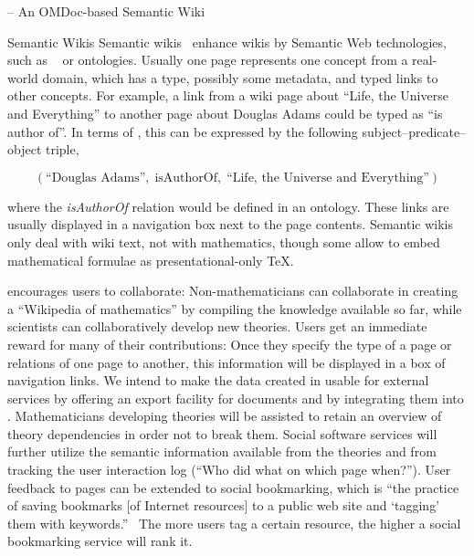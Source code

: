 \begin{omgroup}[id=swim,creators={clange,miko}]{{\swim} -- An OMDoc-based Semantic Wiki}
\begin{omgroup}{Semantic Wikis}
Semantic
wikis~\cite{voelkel06:semanticwikistateoftheart,TolPas06:wikis-semantic-hypermedia}
enhance wikis by Semantic Web technologies, such as {\rdf}~\cite{LasSwi:rdf99} or
ontologies.  Usually one page represents one concept from a real-world domain, which has a
type, possibly some metadata, and typed links to other concepts.  For example, a link from
a wiki page about ``Life, the Universe and Everything'' to another page about Douglas
Adams could be typed as ``is author of''.  In terms of {\rdf}, this can be expressed by the
following subject--predicate--object triple,

\[
(\mbox{``Douglas Adams''},\;\mbox{isAuthorOf},\;\mbox{``Life, the Universe and
Everything''})
\]

where the \textit{isAuthorOf} relation would be defined in an ontology.  These links are
usually displayed in a navigation box next to the page contents. Semantic wikis only deal
with wiki text, not with mathematics, though some allow to embed mathematical formulae as
presentational-only {\TeX}.

{\swim} encourages users to collaborate: Non-mathematicians can collaborate in creating a
``Wikipedia of mathematics'' by compiling the knowledge available so far, while scientists
can collaboratively develop new theories.  Users get an immediate reward for many of their
contributions: Once they specify the type of a page or relations of one page to another,
this information will be displayed in a box of navigation links.  We intend to make the
data created in {\swim} usable for external services by offering an export facility for
{\omdoc} documents and by integrating them into {\swim}.  Mathematicians developing
theories will be assisted to retain an overview of theory dependencies in order not to
break them.  Social software services will further utilize the semantic information
available from the theories and from tracking the user interaction log (``Who did what on
which page when?'').  User feedback to pages can be extended to social bookmarking, which
is ``the practice of saving bookmarks [of Internet resources] to a public web site and
`tagging' them with keywords.''~\cite{lomas05:social-bookmarking} The more users tag a
certain resource, the higher a social bookmarking service will rank it.


\end{omgroup}
\end{omgroup}
